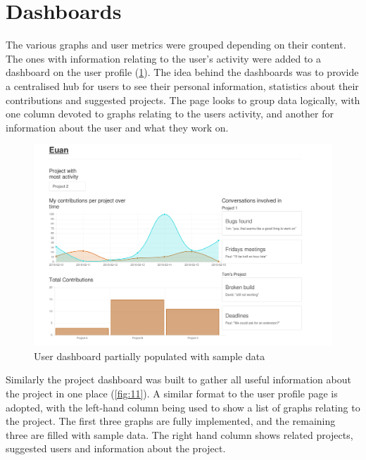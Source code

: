 \documentclass{l4proj}
\begin{document}
\section{Dashboards}

The various graphs and user metrics were grouped depending on their content.  The ones with information relating to the user's activity were added to a dashboard on the user profile (\ref{fig:12}).  The idea behind the dashboards was to provide a centralised hub for users to see their personal information, statistics about their contributions and suggested projects.  The page looks to group data logically, with one column devoted to graphs relating to the users activity, and another for information about the user and what they work on.

\begin{figure}[h]
\includegraphics[scale=0.50]{profile-dashboard.png}
\centering
\caption{User dashboard partially populated with sample data}
\label{fig:12}
\end{figure}

\newpage

Similarly the project dashboard was built to gather all useful information about the project in one place (\ref{fig:11}).  A similar format to the user profile page is adopted, with the left-hand column being used to show a list of graphs relating to the project.  The first three graphs are fully implemented, and the remaining three are filled with sample data.  The right hand column shows related projects, suggested users and information about the project.
\end{document}
